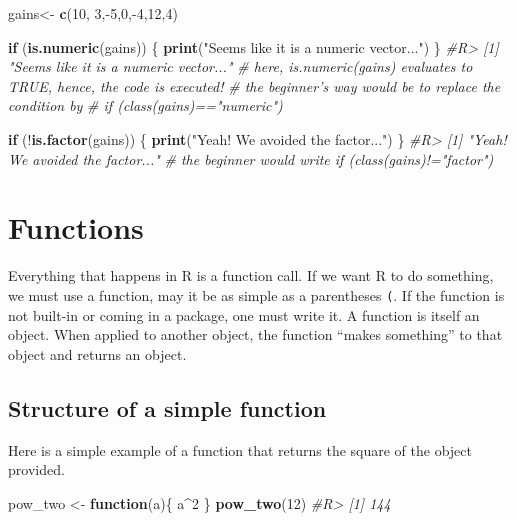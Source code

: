 \documentclass[]{book}
\newenvironment{Shaded}{}{}
\newcommand{\CommentTok}[1]{\textcolor[rgb]{0.38,0.63,0.69}{\textit{#1}}}
\newcommand{\ControlFlowTok}[1]{\textcolor[rgb]{0.00,0.44,0.13}{\textbf{#1}}}
\newcommand{\DecValTok}[1]{\textcolor[rgb]{0.25,0.63,0.44}{#1}}
\newcommand{\KeywordTok}[1]{\textcolor[rgb]{0.00,0.44,0.13}{\textbf{#1}}}
\newcommand{\NormalTok}[1]{#1}
\newcommand{\OperatorTok}[1]{\textcolor[rgb]{0.40,0.40,0.40}{#1}}
\newcommand{\StringTok}[1]{\textcolor[rgb]{0.25,0.44,0.63}{#1}}
\theoremstyle{definition}
\theoremstyle{definition}
\theoremstyle{definition}
\theoremstyle{remark}
\begin{document}
\begin{Shaded}
\begin{Highlighting}[]
\NormalTok{gains<-}\StringTok{ }\KeywordTok{c}\NormalTok{(}\DecValTok{10}\NormalTok{, }\DecValTok{3}\NormalTok{,}\OperatorTok{-}\DecValTok{5}\NormalTok{,}\DecValTok{0}\NormalTok{,}\OperatorTok{-}\DecValTok{4}\NormalTok{,}\DecValTok{12}\NormalTok{,}\DecValTok{4}\NormalTok{)}

\ControlFlowTok{if}\NormalTok{ (}\KeywordTok{is.numeric}\NormalTok{(gains)) \{}
  \KeywordTok{print}\NormalTok{(}\StringTok{"Seems like it is a numeric vector..."}\NormalTok{)}
\NormalTok{\}}
\CommentTok{#R> [1] "Seems like it is a numeric vector..."}
\CommentTok{# here, is.numeric(gains) evaluates to TRUE, hence, the code is executed!}
\CommentTok{# the beginner's way would be to replace the condition by}
\CommentTok{# if (class(gains)=="numeric")}

\ControlFlowTok{if}\NormalTok{ (}\OperatorTok{!}\KeywordTok{is.factor}\NormalTok{(gains)) \{}
  \KeywordTok{print}\NormalTok{(}\StringTok{"Yeah! We avoided the factor..."}\NormalTok{)}
\NormalTok{\}}
\CommentTok{#R> [1] "Yeah! We avoided the factor..."}
\CommentTok{# the beginner would write if (class(gains)!="factor")}
\end{Highlighting}
\end{Shaded}

\hypertarget{functions}{%
\chapter{Functions}\label{functions}}

Everything that happens in R is a function call. If we want R to do
something, we must use a function, may it be as simple as a parentheses
\texttt{(}. If the function is not built-in or coming in a package, one
must write it. A function is itself an object. When applied to another
object, the function ``makes something'' to that object and returns an
object.

\hypertarget{structure-of-a-simple-function}{%
\section{Structure of a simple
function}\label{structure-of-a-simple-function}}

Here is a simple example of a function that returns the square of the
object provided.

\begin{Shaded}
\begin{Highlighting}[]
\NormalTok{pow_two <-}\StringTok{ }\ControlFlowTok{function}\NormalTok{(a)\{}
\NormalTok{  a}\OperatorTok{^}\DecValTok{2}
\NormalTok{\}}
\KeywordTok{pow_two}\NormalTok{(}\DecValTok{12}\NormalTok{)}
\CommentTok{#R> [1] 144}
\end{Highlighting}
\end{Shaded}
\end{document}
